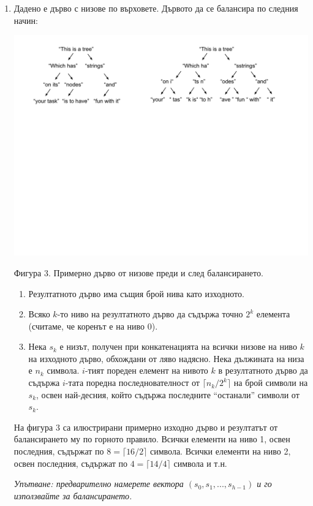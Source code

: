 \documentclass[12pt,a4paper]{article}
\begin{document}
\begin{enumerate}
	\item Дадено е дърво с низове по върховете. Дървото да се балансира по следния начин:

	\begin{flushleft}
	\includegraphics[width=15cm]{images/tree4}

	\vspace{-200px}

	Фигура 3. Примерно дърво от низове преди и след балансирането.
	\end{flushleft}


	\begin{enumerate}
	  \item Резултатното дърво има същия брой нива като изходното.
		\item Всяко $k$-то ниво на резултатното дърво да съдържа точно $2^k$ елемента (считаме, че коренът е на ниво 0).
		\item Нека $s_k$ е низът, получен при конкатенацията на всички низове на ниво $k$ на изходното дърво, обхождани от ляво надясно. Нека дължината на низа е $n_k$ символа. $i$-тият пореден елемент на нивото $k$ в резултатното дърво да съдържа $i$-тата поредна последнователност от $\lceil{n_k/{2^k}}\rceil$ на брой символи на $s_k$, освен най-десния, който съдържа последните ``останали'' символи от $s_k$.
	\end{enumerate}

	На фигура 3 са илюстрирани примерно изходно дърво и резултатът от балансирането му по горното правило. Всички елементи на ниво 1, освен последния, съдържат по $8=\lceil{16/2}\rceil$ символа. Всички елементи на ниво 2, освен последния, съдържат по $4=\lceil{14/4}\rceil$ символа и т.н.


	\emph{Упътване: предварително намерете вектора $(s_0,s_1,...,s_{h-1})$ и го използвайте за балансирането.}

\end{enumerate}
\end{document}
